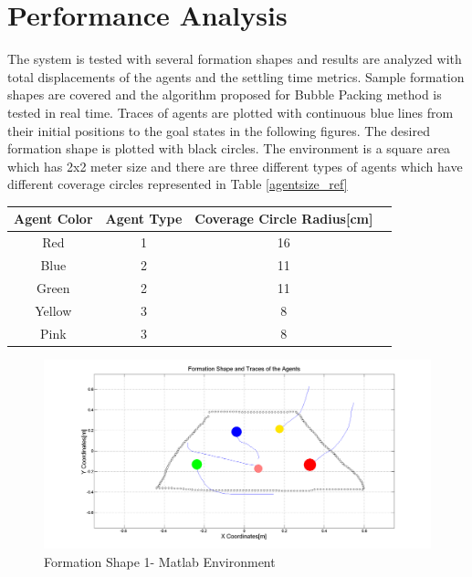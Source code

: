 \section{Performance Analysis}
The system is tested with several formation shapes and results are analyzed with total displacements of the agents and the settling time metrics. Sample formation shapes are covered  and the algorithm proposed for Bubble Packing method is tested in real time.  Traces of agents are plotted with continuous blue lines from their initial positions to the goal states in the following figures. The desired formation shape is plotted with black circles. The environment is a square area which has 2x2 meter size and there are three different types of agents which have different coverage circles represented in Table \ref{agentsize_ref}

\begin{center}
 \label{agentsize_ref} 
\begin{tabular}{|c| c |c |c ||}
\hline
\textbf{Agent Color}  & \textbf{Agent Type} & \textbf{Coverage Circle Radius[cm]}\\ 
\hline
Red & 1 & 16 \\
Blue & 2 & 11 \\
Green & 2 & 11 \\
Yellow & 3 & 8 \\
Pink & 3 & 8 \\
\hline
\end{tabular}
\end{center}
		
\begin{figure}[H]
\caption{Formation Shape 1- Matlab Environment} \label{hardhard1}
\centerline{\includegraphics[scale = 0.32]{2_hardware}}
\end{figure} 
			
